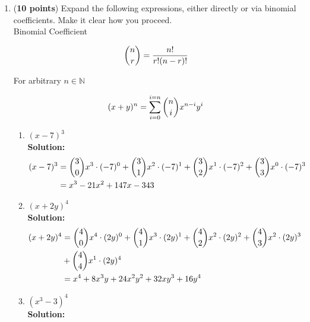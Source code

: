 \documentclass[a4paper]{article}
\begin{document}
\begin{enumerate}
\begin{enumerate}
\end{enumerate}


\item (\textbf{10 points}) Expand the following expressions, either directly or via binomial coefficients. Make it clear how you proceed.\\

Binomial Coefficient

\begin{align}
	{n \choose r} = \frac{n!}{r!(n - r)!}\notag
\end{align}


For arbitrary $n \in \mathbb{N}$

\begin{align}
	(x+y)^n = \sum_{i=0}^{i=n}{n \choose i}x^{n-i}y^i\notag
\end{align}





\begin{enumerate}
	\item $(x-7)^3$\\
	\textbf{Solution:}\\

\begin{align}
(x-7)^3 &= {3 \choose 0}x^3 \cdot (-7)^0 + {3 \choose 1}x^2 \cdot (-7)^1 + {3 \choose 2}x^1 \cdot (-7)^2 + {3 \choose 3}x^0 \cdot (-7)^3\notag\\
&= x^3 - 21x^2 + 147x - 343\notag
\end{align}



	\item $(x+2y)^4$\\
	\textbf{Solution:}\\
	
\begin{align}
(x+2y)^4 &= {4 \choose 0}x^4 \cdot (2y)^0 + {4 \choose 1}x^3 \cdot (2y)^1 +{4 \choose 2}x^2 \cdot (2y)^2 + {4 \choose 3}x^2 \cdot (2y)^3\notag\\ &+ {4 \choose 4}x^1 \cdot (2y)^4\notag\\
&= x^4 + 8x^3y + 24x^2y^2 + 32xy^3 + 16y^4\notag
\end{align}	
	
	
	\item $(x^3-3)^4$\\
	\textbf{Solution:}\\
	

\end{enumerate}
\end{enumerate}
\end{document}

